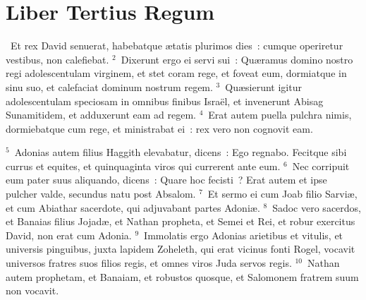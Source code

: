 \clearpage
{\centering \section*{Liber Tertius Regum}}\thispagestyle{empty}

~Et rex David senuerat, habebatque \ae tatis plurimos dies~: cumque operiretur vestibus, non calefiebat.
${}^{2}$~Dixerunt ergo ei servi sui~: Qu\ae ramus domino nostro regi adolescentulam virginem, et stet coram rege, et foveat eum, dormiatque in sinu suo, et calefaciat dominum nostrum regem.
${}^{3}$~Qu\ae sierunt igitur adolescentulam speciosam in omnibus finibus Isra\"el, et invenerunt Abisag Sunamitidem, et adduxerunt eam ad regem.
${}^{4}$~Erat autem puella pulchra nimis, dormiebatque cum rege, et ministrabat ei~: rex vero non cognovit eam.


${}^{5}$~Adonias autem filius Haggith elevabatur, dicens~: Ego regnabo. Fecitque sibi currus et equites, et quinquaginta viros qui currerent ante eum.
${}^{6}$~Nec corripuit eum pater suus aliquando, dicens~: Quare hoc fecisti~? Erat autem et ipse pulcher valde, secundus natu post Absalom.
${}^{7}$~Et sermo ei cum Joab filio Sarvi\ae , et cum Abiathar sacerdote, qui adjuvabant partes Adoni\ae .
${}^{8}$~Sadoc vero sacerdos, et Banaias filius Jojad\ae , et Nathan propheta, et Semei et Rei, et robur exercitus David, non erat cum Adonia.
${}^{9}$~Immolatis ergo Adonias arietibus et vitulis, et universis pinguibus, juxta lapidem Zoheleth, qui erat vicinus fonti Rogel, vocavit universos fratres suos filios regis, et omnes viros Juda servos regis.
${}^{10}$~Nathan autem prophetam, et Banaiam, et robustos quosque, et Salomonem fratrem suum non vocavit.


